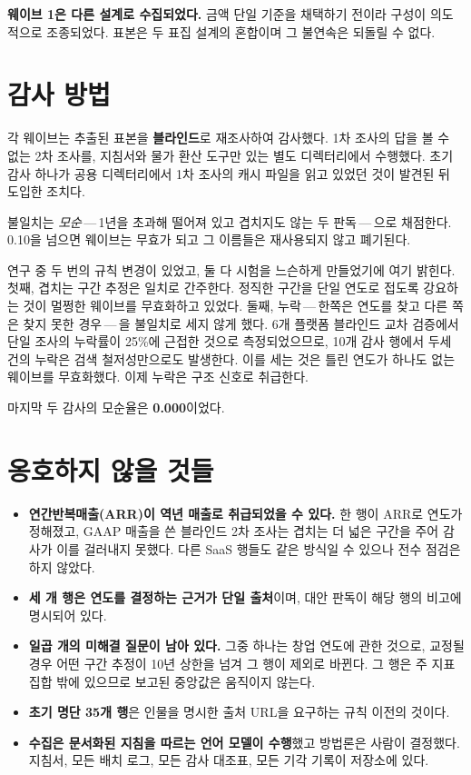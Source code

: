 \documentclass[11pt]{article}
\begin{document}
\textbf{웨이브 1은 다른 설계로 수집되었다.} 금액 단일 기준을 채택하기 전이라 구성이
의도적으로 조종되었다. 표본은 두 표집 설계의 혼합이며 그 불연속은 되돌릴 수 없다.

\section{감사 방법}

각 웨이브는 추출된 표본을 \textbf{블라인드}로 재조사하여 감사했다. 1차 조사의 답을 볼 수
없는 2차 조사를, 지침서와 물가 환산 도구만 있는 별도 디렉터리에서 수행했다. 초기 감사
하나가 공용 디렉터리에서 1차 조사의 캐시 파일을 읽고 있었던 것이 발견된 뒤 도입한
조치다.

불일치는 \emph{모순}\,---\,1년을 초과해 떨어져 있고 겹치지도 않는 두 판독\,---\,으로
채점한다. 0.10을 넘으면 웨이브는 무효가 되고 그 이름들은 재사용되지 않고 폐기된다.

연구 중 두 번의 규칙 변경이 있었고, 둘 다 시험을 느슨하게 만들었기에 여기 밝힌다. 첫째,
겹치는 구간 추정은 일치로 간주한다. 정직한 구간을 단일 연도로 접도록 강요하는 것이
멀쩡한 웨이브를 무효화하고 있었다. 둘째, 누락\,---\,한쪽은 연도를 찾고 다른 쪽은 찾지
못한 경우\,---\,을 불일치로 세지 않게 했다. 6개 플랫폼 블라인드 교차 검증에서 단일 조사의
누락률이 25\%에 근접한 것으로 측정되었으므로, 10개 감사 행에서 두세 건의 누락은 검색
철저성만으로도 발생한다. 이를 세는 것은 틀린 연도가 하나도 없는 웨이브를 무효화했다. 이제
누락은 구조 신호로 취급한다.

마지막 두 감사의 모순율은 \textbf{0.000}이었다.

\section{옹호하지 않을 것들}

\begin{itemize}
\item \textbf{연간반복매출(ARR)이 역년 매출로 취급되었을 수 있다.} 한 행이 ARR로
연도가 정해졌고, GAAP 매출을 쓴 블라인드 2차 조사는 겹치는 더 넓은 구간을 주어 감사가
이를 걸러내지 못했다. 다른 SaaS 행들도 같은 방식일 수 있으나 전수 점검은 하지 않았다.
\item \textbf{세 개 행은 연도를 결정하는 근거가 단일 출처}이며, 대안 판독이 해당 행의
비고에 명시되어 있다.
\item \textbf{일곱 개의 미해결 질문이 남아 있다.} 그중 하나는 창업 연도에 관한 것으로,
교정될 경우 어떤 구간 추정이 10년 상한을 넘겨 그 행이 제외로 바뀐다. 그 행은 주 지표
집합 밖에 있으므로 보고된 중앙값은 움직이지 않는다.
\item \textbf{초기 명단 35개 행}은 인물을 명시한 출처 URL을 요구하는 규칙 이전의 것이다.
\item \textbf{수집은 문서화된 지침을 따르는 언어 모델이 수행}했고 방법론은 사람이
결정했다. 지침서, 모든 배치 로그, 모든 감사 대조표, 모든 기각 기록이 저장소에 있다.
\end{itemize}
\end{document}
